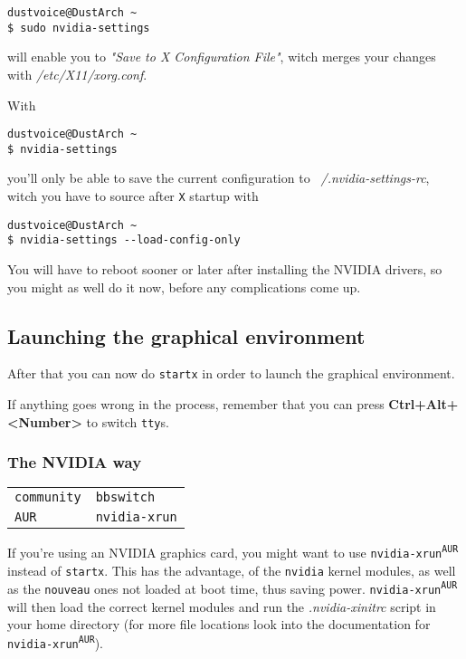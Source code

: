 \documentclass[9pt]{report}
\newenvironment{NOTE}
{\begin{tcolorbox}[colback=admonitionBG,coltitle=draculaFG,colframe=draculaBlue,colbacktitle=draculaBlue,title=NOTE]}
{\end{tcolorbox}}
\newenvironment{packagetable}
{\begin{longtabu}to \textwidth [b]{X[1,r]|X[1,l]}}
{\end{longtabu}}
\begin{document}
\begin{verbatim}
dustvoice@DustArch ~
$ sudo nvidia-settings
\end{verbatim}

will enable you to \emph{"Save to X Configuration File"}, witch merges your changes with \textit{/etc/X11/xorg.conf}.


With


\begin{verbatim}
dustvoice@DustArch ~
$ nvidia-settings
\end{verbatim}

you’ll only be able to save the current configuration to \textit{~/.nvidia-settings-rc}, witch you have to source after \texttt{X} startup with


\begin{verbatim}
dustvoice@DustArch ~
$ nvidia-settings --load-config-only
\end{verbatim}

\begin{NOTE}
    You will have to reboot sooner or later after installing the NVIDIA drivers, so you might as well do it now, before any complications come up.

\end{NOTE}

\newpage

\hypertarget{x-launching-the-graphical-environment}{\subsection{Launching the graphical environment}}
After that you can now do \texttt{startx} in order to launch the graphical environment.


If anything goes wrong in the process, remember that you can press \textbf{Ctrl+Alt+<Number>} to switch \texttt{tty}s.



\newpage

\hypertarget{x-the-nvidia-way}{\subsubsection{The NVIDIA way}}
\begin{packagetable}
    \texttt{community} & \texttt{bbswitch} \\ 
    \texttt{AUR} & \texttt{nvidia-xrun} \\ 
\end{packagetable}

If you’re using an NVIDIA graphics card, you might want to use \texttt{nvidia-xrun\textsuperscript{\texttt{AUR}}} instead of \texttt{startx}.
This has the advantage, of the \texttt{nvidia} kernel modules, as well as the \texttt{nouveau} ones not loaded at boot time, thus saving power.
\texttt{nvidia-xrun\textsuperscript{\texttt{AUR}}} will then load the correct kernel modules and run the \textit{.nvidia-xinitrc} script in your home directory (for more file locations look into the documentation for \texttt{nvidia-xrun\textsuperscript{\texttt{AUR}}}).
\end{document}
